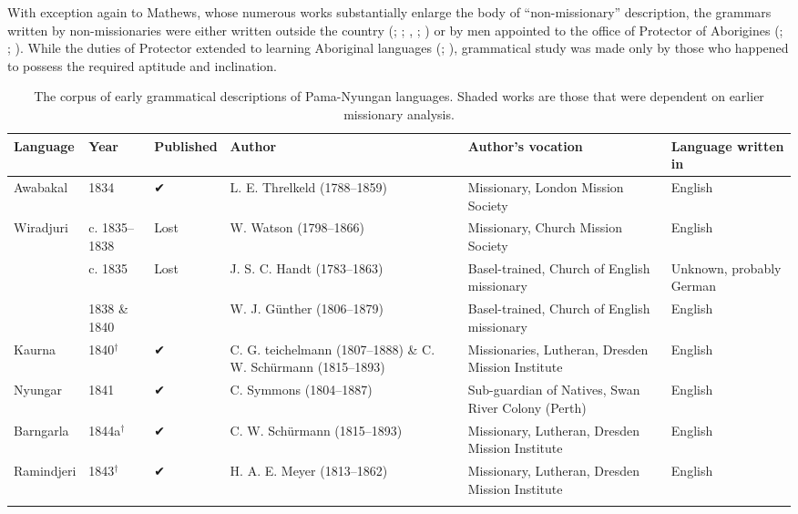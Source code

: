 With exception again to Mathews, whose numerous works substantially enlarge the body of “non-missionary” description, the grammars written by non-missionaries were either written outside the country (\citealt{ray_study_1893}; \citealt{ray_linguistics_1907}; \citealt{planert_australische_1907}, \citeyear{planert_australische_1908}; \citealt{gatti_lingua_1930}) or by men appointed to the office of Protector of Aborigines (\citealt{symmons_grammatical_1841}; \citealt{moorhouse_vocabulary_1846}; \citealt{roth_structure_1901}). While the duties of Protector extended to learning Aboriginal languages (\citealt[50]{jones_box_1996}; \citealt{blake_nineteenth-century_2016}), grammatical study was made only by those who happened to possess the required aptitude and inclination. 

\begin{table}\footnotesize
    \caption{The corpus of early grammatical descriptions of Pama-Nyungan languages. Shaded works are those that were dependent on earlier missionary analysis.}
    \label{tab:1:1}
    \begin{tabularx}{\textwidth}{QllQQQ}
        \lsptoprule
        Language & Year & Published & Author & Author's vocation & Language written in \\
        \midrule
        Awabakal & 1834 & ✔ & L. E. Threlkeld (1788--1859) & Missionary, London Mission Society & English \\
        Wiradjuri & c. 1835--1838 & Lost  & W. Watson (1798--1866) & Missionary, Church Mission Society & English \\
         & c. 1835 & Lost  & J. S. C. Handt (1783--1863) & Basel-trained, Church of English missionary & Unknown, probably German \\
         & 1838 \& 1840 &  & W. J. Günther (1806--1879) & Basel-trained, Church of English missionary & English \\
         Kaurna & 1840$^{\dagger}$ & ✔ & C. G. teichelmann (1807--1888) \& C. W. Schürmann (1815--1893) & Missionaries, Lutheran, Dresden Mission Institute & English \\
         Nyungar & 1841 & ✔ & C. Symmons (1804--1887) & Sub-guardian of Natives, Swan River Colony (Perth) & English \\
         Barngarla & 1844a$^{\dagger}$ & ✔ & C. W. Schürmann (1815--1893) & Missionary, Lutheran, Dresden Mission Institute & English \\
         Ramindjeri & 1843$^{\dagger}$ & ✔ & H. A. E. Meyer (1813–1862) & Missionary, Lutheran, Dresden Mission Institute & English \\
         \lspbottomrule
         \end{tabularx}
\end{table}


